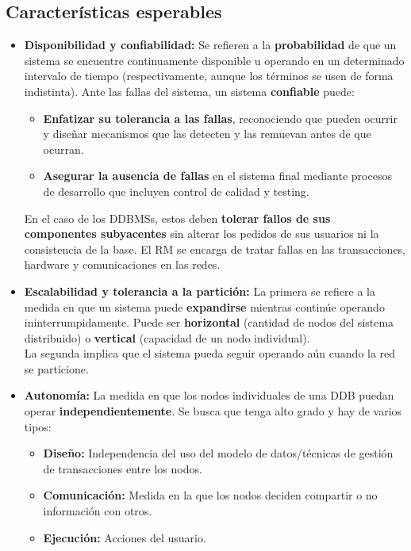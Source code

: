 \subsection*{Características esperables}
\begin{itemize}
    \item \textbf{Disponibilidad y confiabilidad:} Se refieren a la \textbf{probabilidad} de que un sistema se encuentre continuamente disponible u operando en un determinado intervalo de tiempo (respectivamente, aunque los términos se usen de forma indistinta). Ante las fallas del sistema, un sistema \textbf{confiable} puede:
    \begin{itemize}
        \item \textbf{Enfatizar su tolerancia a las fallas}, reconociendo que pueden ocurrir y diseñar mecanismos que las detecten y las remuevan antes de que ocurran.
        \item \textbf{Asegurar la ausencia de fallas} en el sistema final mediante procesos de desarrollo que incluyen control de calidad y testing.
    \end{itemize}
    En el caso de los DDBMSs, estos deben \textbf{tolerar fallos de sus componentes subyacentes} sin alterar los pedidos de sus usuarios ni la consistencia de la base. El RM se encarga de tratar fallas en las transacciones, hardware y comunicaciones en las redes.
    \item \textbf{Escalabilidad y tolerancia a la partición:} La primera se refiere a la medida en que un sistema puede \textbf{expandirse} mientras continúe operando ininterrumpidamente. Puede ser \textbf{horizontal} (cantidad de nodos del sistema distribuido) o \textbf{vertical} (capacidad de un nodo individual). \\
    La segunda implica que el sistema pueda seguir operando aún cuando la red se particione.
    \item \textbf{Autonomía:} La medida en que los nodos individuales de una DDB puedan operar \textbf{independientemente}. Se busca que tenga alto grado y hay de varios tipos:
    \begin{itemize}
        \item \textbf{Diseño:} Independencia del uso del modelo de datos/técnicas de gestión de transacciones entre los nodos.
        \item \textbf{Comunicación:} Medida en la que los nodos deciden compartir o no información con otros.
        \item \textbf{Ejecución:} Acciones  del usuario.
    \end{itemize}
\end{itemize}

